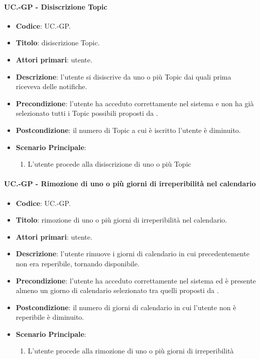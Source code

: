 	\paragraph{UC\theuccount.\thesubuccount-GP - Disiscrizione Topic}
		
		\begin{itemize}
			\item \textbf{Codice}: UC\theuccount.\thesubuccount-GP.
			\item \textbf{Titolo}: disiscrizione Topic.
			\item \textbf{Attori primari}: utente.
			\item \textbf{Descrizione}: l’utente si disiscrive da uno o più Topic dai quali prima riceveva delle notifiche.
			\item \textbf{Precondizione}: l’utente ha acceduto correttamente nel sistema e non ha già selezionato tutti i Topic possibili proposti da \progetto.
			\item \textbf{Postcondizione}: il numero di Topic a cui è iscritto l’utente è diminuito.
			\item \textbf{Scenario Principale}:
			\begin{enumerate}
				\item L'utente procede alla disiscrizione di uno o più Topic
			\end{enumerate}
		\end{itemize}
	
	\paragraph{UC\theuccount.\thesubuccount-GP - Rimozione di uno o più giorni di irreperibilità nel calendario}
	
	\begin{itemize}
		\item \textbf{Codice}: UC\theuccount.\thesubuccount-GP.
		\item \textbf{Titolo}: rimozione di uno o più giorni di irreperibilità nel calendario.
		\item \textbf{Attori primari}: utente.
		\item \textbf{Descrizione}: l’utente rimuove i giorni di calendario in cui precedentemente	non era reperibile, tornando disponibile.
		\item \textbf{Precondizione}: l’utente ha acceduto correttamente nel sistema ed è presente almeno un giorno di calendario selezionato tra quelli proposti da \progetto.
		\item \textbf{Postcondizione}: il numero di giorni di calendario in cui l’utente non è reperibile è diminuito.
		\item \textbf{Scenario Principale}:
		\begin{enumerate}
			\item L'utente procede alla rimozione di uno o più giorni di irreperibilità
		\end{enumerate}
	\end{itemize}
	
